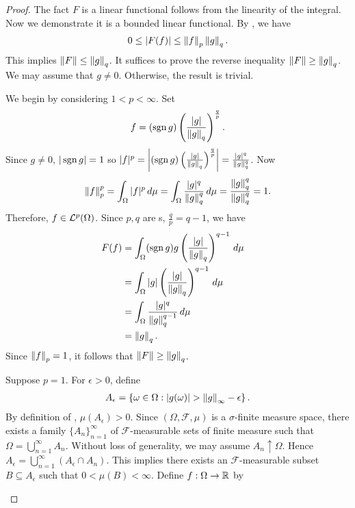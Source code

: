 \begin{proof}
The fact $F$ is a linear functional follows from the linearity of the integral.
Now we demonstrate it is a bounded linear functional.
By , we have
\begin{align*}
    0 \leq | F (f) | \leq \left\lVert f\right\rVert_p \left\lVert g\right\rVert_q.
\end{align*}
This implies $\left\lVert F\right\rVert \leq \left\lVert g\right\rVert_q$. It suffices to prove the reverse inequality $\left\lVert F\right\rVert \geq \left\lVert g\right\rVert_q$.
We may assume that $g \neq 0$. Otherwise, the result is trivial.
\setcounter{step}{0}
\begin{step}
We begin by considering $1 < p < \infty$. Set
\begin{equation}
    f = (\operatorname*{sgn} g) \left ( \frac{|g|}{\left\lVert g\right\rVert_q} \right )^{\frac{q}{p}}.
\end{equation}
Since $g \neq 0$, $|\operatorname*{sgn} g| = 1$ so $|f|^p = \left| (\operatorname*{sgn} g) \left ( \frac{|g|}{\left\lVert g\right\rVert_q} \right )^{\frac{q}{p}} \right| =\frac{|g|^q}{\left\lVert g\right\rVert_q^q}$. Now
\begin{align*}
    \left\lVert f\right\rVert_p^p = \int_\Omega |f|^p \,d\mu = \int_\Omega  \frac{|g|^q}{\left\lVert g\right\rVert_q^q} \,d\mu = \frac{\left\lVert g\right\rVert_q^q}{\left\lVert g\right\rVert_q^q} = 1.
\end{align*}
Therefore, $f \in {\mathcal {L}^p}(\Omega)$. Since $p, q$ are s, $\frac{q}{p} = q - 1$, we have
\begin{align*}
    F (f) &= \int_\Omega (\operatorname*{sgn} g) g \left ( \frac{|g|}{\left\lVert g\right\rVert_q} \right )^{q - 1} \,d\mu & \\
          &= \int_\Omega |g| \left ( \frac{|g|}{\left\lVert g\right\rVert_q} \right )^{q - 1} \,d\mu & \\
          &= \int_\Omega \frac{|g|^q}{\left\lVert g\right\rVert_q^{q - 1}}  \,d\mu  & \\
          &= \left\lVert g\right\rVert_q.
\end{align*}
Since $\left\lVert f\right\rVert_p = 1$, it follows that $\left\lVert F\right\rVert \geq \left\lVert g\right\rVert_q$.
\end{step}
\begin{step}
Suppose $p = 1$. For $\epsilon > 0$, define
\begin{align*}
    A_\epsilon = \left \{ \omega \in \Omega : | g(\omega) | > \left\lVert g\right\rVert_\infty - \epsilon \right \}.
\end{align*}
By definition of , $\mu (A_\epsilon) > 0$. Since $(\Omega, \mathcal{F}, \mu)$ is a $\sigma$-finite measure space, there exists a family $\{ A_n \}_{n = 1}^{\infty}$ of $\mathcal{F}$-measurable sets of finite measure such that $\Omega = \bigcup_{n=1}^{\infty} A_n$. Without loss of generality, we may assume $A_n \uparrow \Omega$. Hence $A_\epsilon = \bigcup_{n=1}^{\infty} (A_\epsilon \cap A_n)$. This implies there exists an $\mathcal{F}$-measurable subset $B \subseteq A_\epsilon$ such that $0 < \mu(B) < \infty$. Define $f : \Omega \to {\mathbb R}$ by

\end{step}
\end{proof}
